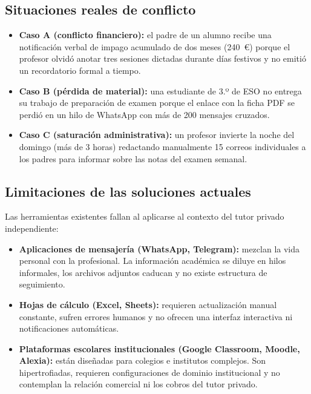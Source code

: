 \documentclass[12pt,a4paper]{report}
\begin{document}
\subsection*{Situaciones reales de conflicto}

\begin{itemize}
    \item \textbf{Caso A (conflicto financiero):} el padre de un alumno
    recibe una notificación verbal de impago acumulado de dos meses
    (240~€) porque el profesor olvidó anotar tres sesiones dictadas
    durante días festivos y no emitió un recordatorio formal a tiempo.
    \item \textbf{Caso B (pérdida de material):} una estudiante de 3.º de
    ESO no entrega su trabajo de preparación de examen porque el enlace
    con la ficha PDF se perdió en un hilo de WhatsApp con más de 200
    mensajes cruzados.
    \item \textbf{Caso C (saturación administrativa):} un profesor
    invierte la noche del domingo (más de 3 horas) redactando
    manualmente 15 correos individuales a los padres para informar sobre
    las notas del examen semanal.
\end{itemize}

\subsection*{Limitaciones de las soluciones actuales}

Las herramientas existentes fallan al aplicarse al contexto del tutor
privado independiente:

\begin{itemize}
    \item \textbf{Aplicaciones de mensajería (WhatsApp, Telegram):}
    mezclan la vida personal con la profesional. La información académica
    se diluye en hilos informales, los archivos adjuntos caducan y no
    existe estructura de seguimiento.
    \item \textbf{Hojas de cálculo (Excel, Sheets):} requieren
    actualización manual constante, sufren errores humanos y no ofrecen
    una interfaz interactiva ni notificaciones automáticas.
    \item \textbf{Plataformas escolares institucionales (Google
    Classroom, Moodle, Alexia):} están diseñadas para colegios e
    institutos complejos. Son hipertrofiadas, requieren configuraciones
    de dominio institucional y no contemplan la relación comercial ni los
    cobros del tutor privado.
\end{itemize}
\end{document}
